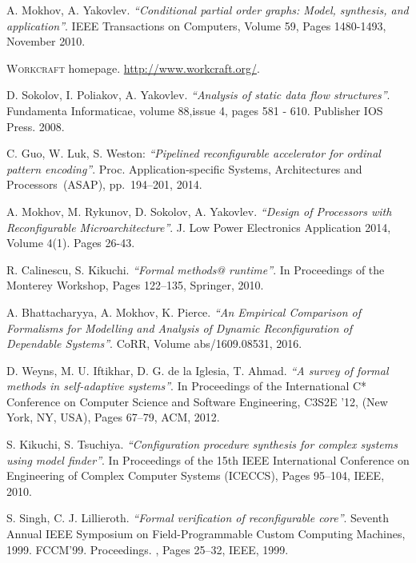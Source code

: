 \documentclass[conference]{IEEEtran}
\begin{document}
\begin{thebibliography}{10}

	A. Mokhov, A. Yakovlev. \emph{``Conditional partial order graphs: Model, 
	synthesis, and application''}. IEEE Transactions on Computers, Volume 59,
	Pages 1480-1493, November 2010.
	
	\textsc{Workcraft} homepage. \url{http://www.workcraft.org/}.	
	
	D. Sokolov, I. Poliakov, A. Yakovlev. \emph{``Analysis of static data flow structures''}.
	Fundamenta Informaticae, volume 88,issue 4, pages 581 - 610. Publisher IOS Press. 2008.

	C. Guo, W. Luk, S. Weston:
	\emph{``Pipelined reconfigurable accelerator for ordinal pattern encoding''}.
	Proc. Application-specific Systems, Architectures and Processors~(ASAP),
	pp.~194--201, 2014.
	
	A. Mokhov, M. Rykunov, D. Sokolov, A. Yakovlev.
	\emph{``Design of Processors with Reconfigurable Microarchitecture''}.
	J. Low Power Electronics Application 2014, Volume 4(1). Pages 26-43.

R. Calinescu, S. Kikuchi. \emph{``Formal methods@ runtime''}. In Proceedings of the Monterey
Workshop, Pages 122–135, Springer, 2010.

A. Bhattacharyya, A. Mokhov, K. Pierce. \emph{``An Empirical Comparison of Formalisms for Modelling and Analysis of
	Dynamic Reconfiguration of Dependable Systems''}. CoRR, Volume abs/1609.08531, 2016.

D. Weyns, M. U. Iftikhar, D. G. de la Iglesia, T. Ahmad. \emph{``A
survey of formal methods in self-adaptive systems''}. In Proceedings of the International C* Conference on 
Computer Science and Software Engineering, C3S2E ’12, (New York, NY, USA), Pages 67–79, ACM, 2012.

S. Kikuchi, S. Tsuchiya. \emph{``Configuration procedure synthesis for complex systems using model finder''}. 
In Proceedings of the 15th IEEE International Conference on Engineering of Complex Computer 
Systems (ICECCS), Pages 95–104, IEEE, 2010.

S. Singh, C. J. Lillieroth. \emph{``Formal verification of reconfigurable core''}. 
Seventh Annual IEEE Symposium on Field-Programmable Custom Computing Machines, 1999. FCCM’99. 
Proceedings. , Pages 25–32, IEEE, 1999.


\end{thebibliography}
\end{document}
